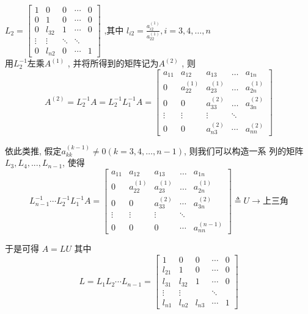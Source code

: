 \documentclass[12pt,a4paper]{article}
\begin{document}
 {$L_{2}=\left[\begin{array}{ccccc}{1} & {0} & {0} & {\cdots} & {0} \\ {0} & {1} & {0} & {\cdots} & {0} \\ {0} & {l_{32}} & {1} & {\cdots} & {0} \\ {\vdots} & {\vdots} & {\ddots} & {\ddots} \\ {0} & {l_{n 2}} & {0} & {\cdots} & {1}\end{array}\right]$ $\text{,其中}$ $l_{i 2}=\frac{a_{i 2}^{(1)}}{a_{22}^{(1)}}, i=3,4, \ldots, n$}\\

用$L_{2}^{-1}$左乘$A^{(1)}$
, 并将所得到的矩阵记为$A^{(2)}$
, 则
$$
A^{(2)}=L_{2}^{-1} A=L_{2}^{-1} L_{1}^{-1}A=\left[\begin{array}{ccccc}{a_{11}} & {a_{12}} & {a_{13}} & {\dots} &{a_{1 n}} \\ {0} & {a_{22}^{(1)}} & {a_{23}^{(1)}} & {\dots} & {a_{2 n}^{(1)}} \\ {0} & {0} & {a_{33}^{(2)}} & {\dots} & {a_{3 n}^{(2)}} \\ {\vdots} & {\vdots} & {\vdots} & {\ddots} &{ } \\ {0} & {0} & {a_{n 3}^{(2)}} & {\cdots} & {a_{n n}^{(2)}}\end{array}\right]
$$

依此类推, 假定$a_{k k}^{(k-1)} \neq 0(k=3,4, \dots, n-1)$, 则我们可以构造一系
列的矩阵$ L_3, L_4, . . . , L_{n−1}$, 使得
$$
L_{n-1}^{-1} \cdots L_{2}^{-1} L_{1}^{-1} A=\left[\begin{array}{ccccc}{a_{11}} & {a_{12}} & {a_{13}} & {\dots} & {a_{1 n}} \\ {0} & {a_{22}^{(1)}} & {a_{23}^{(1)}} & {\dots} & {a_{2 n}^{(1)}} \\ {0} & {0} & {a_{33}^{(2)}} & {\cdots} & {a_{3 n}^{(2)}} \\ {\vdots} & {\vdots} & {\vdots} & {\ddots} \\ {0} & {0} & {0} & {\cdots} & {a_{n n}^{(n-1)}}\end{array}\right] \triangleq U \rightarrow \text{上三角}
$$

于是可得 $A = LU$ 其中
$$
L=L_{1} L_{2} \cdots L_{n-1}=\left[\begin{array}{ccccc}{1} & {0} & {0} & {\cdots} &{0}\\ {l_{21}} & {1} & {0} & {\cdots} &{0}\\ {l_{31}} & {l_{32}} & {1} & {\cdots} &{0}\\ {\vdots} & {\vdots} & { }& {\ddots} & { }\\ {l_{n 1}} & {l_{n 2}} & {l_{n 3}} & {\cdots} &{1}\end{array}\right]
$$
\end{document}
